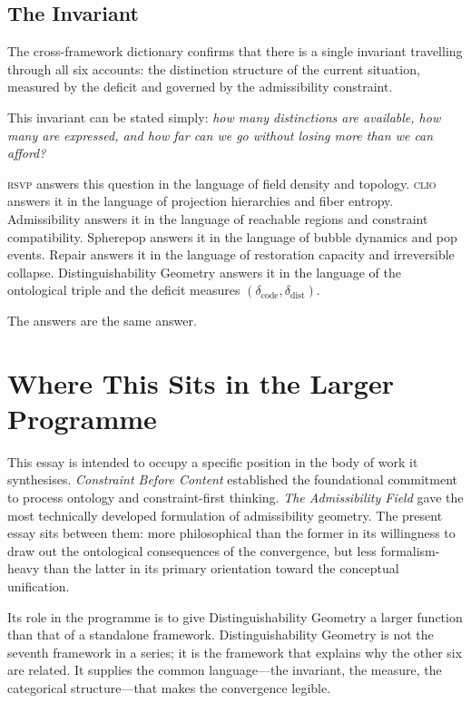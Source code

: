 \documentclass[12pt, letterpaper]{article}
\theoremstyle{remark}
\newcommand{\rsvp}{\textsc{rsvp}}
\newcommand{\clio}{\textsc{clio}}
\newcommand{\Dc}{\delta_{\mathrm{code}}}
\newcommand{\Dd}{\delta_{\mathrm{dist}}}
\begin{document}
\subsection{The Invariant}

The cross-framework dictionary confirms that there is a single invariant
travelling through all six accounts: the distinction structure of the
current situation, measured by the deficit and governed by the admissibility
constraint.

This invariant can be stated simply: \emph{how many distinctions are
available, how many are expressed, and how far can we go without losing more
than we can afford?}

\rsvp{} answers this question in the language of field density and
topology.  \clio{} answers it in the language of projection hierarchies
and fiber entropy.  Admissibility answers it in the language of reachable
regions and constraint compatibility.  Spherepop answers it in the language
of bubble dynamics and pop events.  Repair answers it in the language of
restoration capacity and irreversible collapse.  Distinguishability Geometry
answers it in the language of the ontological triple and the deficit
measures $(\Dc, \Dd)$.

The answers are the same answer.

\section{Where This Sits in the Larger Programme}

This essay is intended to occupy a specific position in the body of work
it synthesises.  \emph{Constraint Before Content} established the
foundational commitment to process ontology and constraint-first thinking.
\emph{The Admissibility Field} gave the most technically developed
formulation of admissibility geometry.  The present essay sits between
them: more philosophical than the former in its willingness to draw out
the ontological consequences of the convergence, but less formalism-heavy
than the latter in its primary orientation toward the conceptual unification.

Its role in the programme is to give Distinguishability Geometry a larger
function than that of a standalone framework.  Distinguishability Geometry
is not the seventh framework in a series; it is the framework that explains
why the other six are related.  It supplies the common language---the
invariant, the measure, the categorical structure---that makes the
convergence legible.
\end{document}
